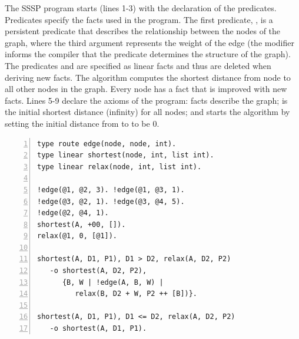 The SSSP program starts (lines 1-3) with the declaration of the predicates.
Predicates specify the facts used in the program. The first predicate,
, is a persistent predicate that describes the
relationship between the nodes of the graph, where the third argument
represents the weight of the edge (the  modifier
informs the compiler that the  predicate
determines the structure of the graph).  The predicates
 and  are specified as linear facts
and thus are deleted when deriving new facts.  The algorithm computes
the shortest distance from node  to all other nodes in the
graph. Every node has a  fact that is improved with
new  facts.  Lines 5-9 declare the axioms of the
program:  facts describe the graph;  is the initial shortest distance (infinity) for all
nodes; and  starts the algorithm by
setting the initial distance from  to  to be 0.

\begin{topfig}
\scriptsize\begin{Verbatim}[numbers=left]
type route edge(node, node, int).
type linear shortest(node, int, list int).
type linear relax(node, int, list int).

!edge(@1, @2, 3). !edge(@1, @3, 1).
!edge(@3, @2, 1). !edge(@3, @4, 5).
!edge(@2, @4, 1).
shortest(A, +00, []).
relax(@1, 0, [@1]).

shortest(A, D1, P1), D1 > D2, relax(A, D2, P2)
   -o shortest(A, D2, P2),
      {B, W | !edge(A, B, W) |
         relax(B, D2 + W, P2 ++ [B])}.

shortest(A, D1, P1), D1 <= D2, relax(A, D2, P2)
   -o shortest(A, D1, P1).
\end{Verbatim}
\end{topfig}

